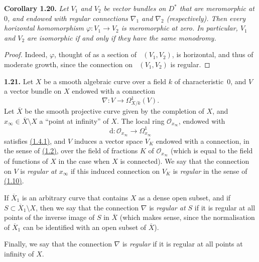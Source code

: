 \documentclass{report}
\newenvironment{itenv}[1]
  {\phantomsection\par\medskip\noindent\textbf{#1.}\itshape}
  {\par\medskip}
\newenvironment{rmenv}[1]
  {\phantomsection\par\medskip\noindent\textbf{#1.}\rmfamily}
  {\par\medskip}
\renewcommand{\cal}[1]{{\mathcal{#1}}}
\newcommand{\dd}{\mathrm{d}}
\DeclareMathOperator{\shHom}{\underline{Hom}}
\newcommand{\oldpage}[1]{\marginpar{\footnotesize$\Big\vert$ \textit{p.~#1}}}
\begin{document}
\oldpage{57}
\begin{itenv}{Corollary 1.20}
\label{II.1.20}
  Let $V_1$ and $V_2$ be vector bundles on $D^*$ that are meromorphic at $0$, and endowed with regular connections $\nabla_1$ and $\nabla_2$ (respectively).
  Then every horizontal homomorphism $\varphi\colon V_1\to V_2$ is meromorphic at zero.
  In particular, $V_1$ and $V_2$ are isomorphic if and only if they have the same monodromy.
\end{itenv}

\begin{proof}
  Indeed, $\varphi$, thought of as a section of $\shHom(V_1,V_2)$, is horizontal, and thus of moderate growth, since the connection on $\shHom(V_1,V_2)$ is regular.
\end{proof}

\begin{rmenv}{1.21}
\label{II.1.21}
  Let $X$ be a smooth algebraic curve over a field $k$ of characteristic~$0$, and $V$ a vector bundle on $X$ endowed with a connection
  \[
    \nabla\colon V \to \Omega_{X/k}^1(V).
  \]
  Let $\overline{X}$ be the smooth projective curve given by the completion of $X$, and $x_\infty\in\overline{X}\setminus X$ a ``point at infinity'' of $X$.
  The local ring $\cal{O}_{x_\infty}$, endowed with
  \[
    \dd\colon \cal{O}_{x_\infty} \to \Omega_{x_\infty}^1
  \]
  satisfies \hyperref[II.1.4.1]{(1.4.1)}, and $V$ induces a vector space $V_K$ endowed with a connection, in the sense of \hyperref[II.1.2]{(1.2)}, over the field of fractions $K$ of $\cal{O}_{x_\infty}$ (which is equal to the field of functions of $X$ in the case when $X$ is connected).
  We say that the connection on $V$ is \emph{regular at $x_\infty$} if this induced connection on $V_K$ is \emph{regular} in the sense of \hyperref[II.1.10]{(1.10)}.

  If $\overline{X}_1$ is an arbitrary curve that contains $X$ as a dense open subset, and if $S\subset\overline{X}_1\setminus X$, then we say that the connection $\nabla$ is \emph{regular at $S$} if it is regular at all points of the inverse image of $S$ in $\overline{X}$ (which makes sense, since the normalisation of $\overline{X}_1$ can be identified with an open subset of $\overline{X}$).

  Finally, we say that the connection $\nabla$ is \emph{regular} if it is regular at all points at infinity of $X$.
\end{rmenv}
\end{document}
